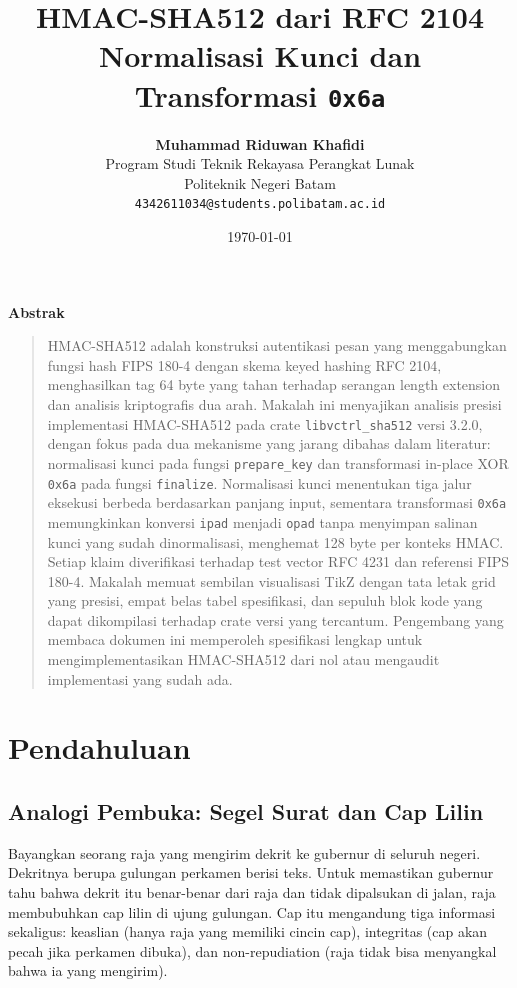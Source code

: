 \documentclass[11pt,a4paper]{article}
\title{\vspace{-1.5cm}\textbf{\sffamily\LARGE HMAC-SHA512 dari RFC 2104\\ Normalisasi Kunci dan Transformasi \texttt{0x6a}}}
\author{
	\textbf{Muhammad Riduwan Khafidi} \\
	\small Program Studi Teknik Rekayasa Perangkat Lunak \\
	\small Politeknik Negeri Batam \\
	\small \texttt{4342611034@students.polibatam.ac.id}
}
\date{\small\today}
\renewenvironment{abstract}
{\small
	\begin{center}\textbf{\sffamily Abstrak}\end{center}
	\begin{quote}}
	{\end{quote}}
\begin{document}
\maketitle
\thispagestyle{empty}

\begin{abstract}
	HMAC-SHA512 adalah konstruksi autentikasi pesan yang menggabungkan fungsi hash FIPS 180-4 dengan skema keyed hashing RFC 2104, menghasilkan tag 64 byte yang tahan terhadap serangan length extension dan analisis kriptografis dua arah. Makalah ini menyajikan analisis presisi implementasi HMAC-SHA512 pada crate \texttt{libvctrl\_sha512} versi 3.2.0, dengan fokus pada dua mekanisme yang jarang dibahas dalam literatur: normalisasi kunci pada fungsi \texttt{prepare\_key} dan transformasi in-place XOR \texttt{0x6a} pada fungsi \texttt{finalize}. Normalisasi kunci menentukan tiga jalur eksekusi berbeda berdasarkan panjang input, sementara transformasi \texttt{0x6a} memungkinkan konversi \texttt{ipad} menjadi \texttt{opad} tanpa menyimpan salinan kunci yang sudah dinormalisasi, menghemat 128 byte per konteks HMAC. Setiap klaim diverifikasi terhadap test vector RFC 4231 dan referensi FIPS 180-4. Makalah memuat sembilan visualisasi TikZ dengan tata letak grid yang presisi, empat belas tabel spesifikasi, dan sepuluh blok kode yang dapat dikompilasi terhadap crate versi yang tercantum. Pengembang yang membaca dokumen ini memperoleh spesifikasi lengkap untuk mengimplementasikan HMAC-SHA512 dari nol atau mengaudit implementasi yang sudah ada.
\end{abstract}

\section{Pendahuluan}

\subsection{Analogi Pembuka: Segel Surat dan Cap Lilin}

Bayangkan seorang raja yang mengirim dekrit ke gubernur di seluruh negeri. Dekritnya berupa gulungan perkamen berisi teks. Untuk memastikan gubernur tahu bahwa dekrit itu benar-benar dari raja dan tidak dipalsukan di jalan, raja membubuhkan cap lilin di ujung gulungan. Cap itu mengandung tiga informasi sekaligus: keaslian (hanya raja yang memiliki cincin cap), integritas (cap akan pecah jika perkamen dibuka), dan non-repudiation (raja tidak bisa menyangkal bahwa ia yang mengirim).
\end{document}
